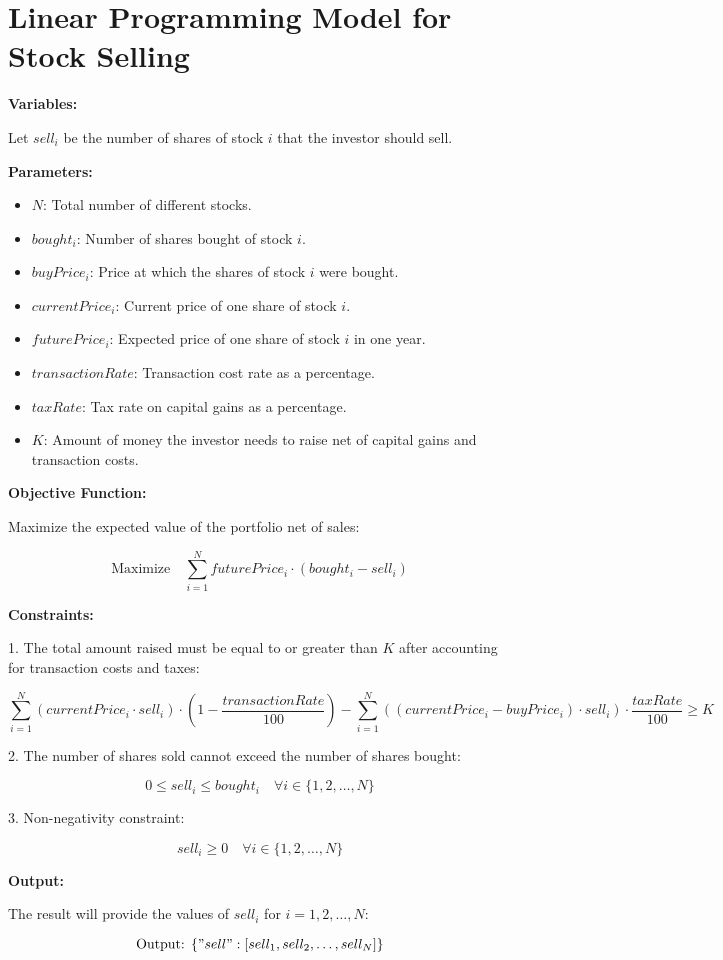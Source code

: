 \documentclass{article}
\begin{document}
\section*{Linear Programming Model for Stock Selling}

\textbf{Variables:}

Let \( sell_i \) be the number of shares of stock \( i \) that the investor should sell.

\textbf{Parameters:}

\begin{itemize}
    \item \( N \): Total number of different stocks.
    \item \( bought_i \): Number of shares bought of stock \( i \).
    \item \( buyPrice_i \): Price at which the shares of stock \( i \) were bought.
    \item \( currentPrice_i \): Current price of one share of stock \( i \).
    \item \( futurePrice_i \): Expected price of one share of stock \( i \) in one year.
    \item \( transactionRate \): Transaction cost rate as a percentage.
    \item \( taxRate \): Tax rate on capital gains as a percentage.
    \item \( K \): Amount of money the investor needs to raise net of capital gains and transaction costs.
\end{itemize}

\textbf{Objective Function:}

Maximize the expected value of the portfolio net of sales:

\[
\text{Maximize} \quad \sum_{i=1}^{N} futurePrice_i \cdot (bought_i - sell_i)
\]

\textbf{Constraints:}

1. The total amount raised must be equal to or greater than \( K \) after accounting for transaction costs and taxes:

\[
\sum_{i=1}^{N} (currentPrice_i \cdot sell_i) \cdot (1 - \frac{transactionRate}{100}) - \sum_{i=1}^{N} ((currentPrice_i - buyPrice_i) \cdot sell_i) \cdot \frac{taxRate}{100} \geq K
\]

2. The number of shares sold cannot exceed the number of shares bought:

\[
0 \leq sell_i \leq bought_i \quad \forall i \in \{1, 2, \ldots, N\}
\]

3. Non-negativity constraint:

\[
sell_i \geq 0 \quad \forall i \in \{1, 2, \ldots, N\}
\]

\textbf{Output:}

The result will provide the values of \( sell_i \) for \( i = 1, 2, \ldots, N \):

\[
\text{Output: } \{ "sell": [sell_1, sell_2, \ldots, sell_N] \}
\]
\end{document}
